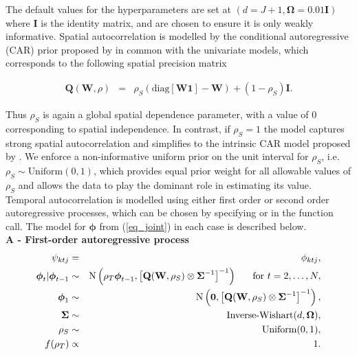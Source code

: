 \documentclass[article, nojss]{jss}
\newcommand{\bd}[1]{\ensuremath{\mbox{\boldmath $#1$}}}
\begin{document}
The default values for the hyperparameters are set at $(d=J+1, \boldsymbol{\Omega}=0.01\mathbf{I})$ where $\mathbf{I}$ is the identity matrix, and are chosen to ensure it is only weakly informative. Spatial autocorrelation is modelled by the conditional autoregressive (CAR) prior proposed by \cite{leroux2000} in common with the univariate models, which corresponds to the following spatial precision matrix

\begin{eqnarray}
\mathbf{Q}(\mathbf{W}, \rho)&=&\rho_S(\mbox{diag}[\mathbf{W1}] - \mathbf{W}) + (1-\rho_S)\mathbf{I}.\label{leroux}
\end{eqnarray}

Thus $\rho_S$ is again a global spatial dependence parameter, with a value of 0 corresponding to spatial independence. In contrast, if $\rho_S=1$ the model captures strong spatial autocorrelation and simplifies to the intrinsic CAR model proposed by \cite{besag1991}. We enforce a non-informative uniform prior on the unit interval for $\rho_S$, i.e. $\rho_S\sim\mbox{Uniform}(0,1)$, which provides equal prior weight for all allowable values of $\rho_S$ and allows the data to play the dominant role in estimating its value. Temporal autocorrelation is modelled using either first order or second order autoregressive processes, which can be chosen by specifying 
or  in the function call. The model for $\boldsymbol{\phi}$ from (\ref{eq_joint}) in each case is described below.\\

\newpage\textbf{A - First-order autoregressive process}\\

\begin{eqnarray}
\psi_{ktj}&=&\phi_{ktj},\\
\bd{\phi}_t|\bd{\phi}_{t-1} & \sim & \mbox{N}\left(\rho_T\boldsymbol{\phi}_{t-1}, \left[\mathbf{Q}(\mathbf{W}, \rho_S)\otimes \boldsymbol{\Sigma}^{-1}\right]^{-1}\right)~~~~~\mbox{for }t=2,\ldots,N,\nonumber\\
\bd{\phi}_1 & \sim & \mbox{N}\left(\mathbf{0}, \left[\mathbf{Q}(\mathbf{W}, \rho_S)\otimes \boldsymbol{\Sigma}^{-1}\right]^{-1}\right),\nonumber\\
\boldsymbol{\Sigma}&\sim&\mbox{Inverse-Wishart}(d, \boldsymbol{\Omega}),\nonumber\\
\rho_S&\sim&\mbox{Uniform}(0,1),\nonumber\\
f(\rho_T)&\propto& 1.\nonumber
\end{eqnarray}
\end{document}
